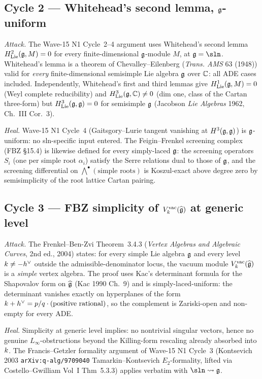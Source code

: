 \subsection{Cycle 2 --- Whitehead's second lemma, $\mathfrak{g}$-uniform}

\emph{Attack.} The Wave-15 N1 Cycle~2--4 argument uses Whitehead's
second lemma $H^2_{\mathrm{Lie}}(\mathfrak{g},M)=0$ for every
finite-dimensional $\mathfrak{g}$-module $M$, at $\gfrak=\sln$.
Whitehead's lemma is a theorem of Chevalley--Eilenberg (\emph{Trans.
AMS} 63 (1948)) valid for \emph{every} finite-dimensional
semisimple Lie algebra $\mathfrak{g}$ over $\mathbb{C}$: all ADE cases included.
Independently, Whitehead's first and third lemmas give
$H^1_{\mathrm{Lie}}(\mathfrak{g},M)=0$ (Weyl complete reducibility) and
$H^3_{\mathrm{Lie}}(\mathfrak{g},\mathbb{C})\ne 0$ (dim one, class of the
Cartan three-form) but $H^3_{\mathrm{Lie}}(\mathfrak{g},\mathfrak{g})=0$ for
semisimple $\mathfrak{g}$ (Jacobson \emph{Lie Algebras} 1962, Ch.~III
Cor.~3).

\emph{Heal.} Wave-15 N1 Cycle~4 (Gaitsgory--Lurie tangent
vanishing at $H^3(\mathfrak{g},\mathfrak{g})$) is $\mathfrak{g}$-uniform: no
sln-specific input entered. The Feigin--Frenkel screening complex
(FBZ \S 15.4) is likewise defined for every simply-laced $\mathfrak{g}$:
the screening operators $S_i$ (one per simple root $\alpha_i$)
satisfy the Serre relations dual to those of $\mathfrak{g}$, and the
screening differential on $\bigwedge^\bullet(\text{simple roots})$
is Koszul-exact above degree zero by semisimplicity of the root
lattice Cartan pairing.

\subsection{Cycle 3 --- FBZ simplicity of $V^{\mathrm{vac}}_{k}(\widehat{\mathfrak{g}})$ at generic level}

\emph{Attack.} The Frenkel--Ben-Zvi Theorem~3.4.3 (\emph{Vertex
Algebras and Algebraic Curves}, 2nd ed., 2004) states: for every
simple Lie algebra $\mathfrak{g}$ and every level $k\ne-h^{\vee}$
outside the admissible-denominator locus, the vacuum module
$V^{\mathrm{vac}}_{k}(\widehat{\mathfrak{g}})$ is a \emph{simple} vertex algebra. The proof uses Kac's
determinant formula for the Shapovalov form on $\widehat{\mathfrak{g}}$
(Kac 1990 Ch.~9) and is simply-laced-uniform: the determinant
vanishes exactly on hyperplanes of the form $k+h^{\vee}=
p/q\cdot(\text{positive rational})$, so the complement is
Zariski-open and non-empty for every ADE.

\emph{Heal.} Simplicity at generic level implies: no nontrivial
singular vectors, hence no genuine $L_\infty$-obstructions beyond
the Killing-form rescaling already absorbed into $k$. The
Francis--Getzler formality argument of Wave-15 N1 Cycle~3
(Kontsevich 2003 \texttt{arXiv:q-alg/9709040}
Tamarkin--Kontsevich $E_2$-formality, lifted via
Costello--Gwilliam Vol~I Thm~5.3.3) applies verbatim with
$\sln\leadsto\gfrak$.


